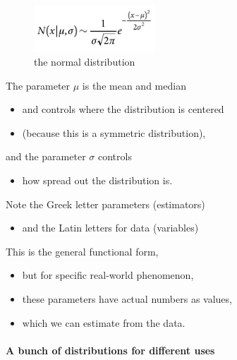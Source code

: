 \documentclass[]{article}
\providecommand{\tightlist}{%
  \setlength{\itemsep}{0pt}\setlength{\parskip}{0pt}}
\let\oldparagraph\paragraph
\renewcommand{\paragraph}[1]{\oldparagraph{#1}\mbox{}}
\begin{document}
\begin{figure}
\centering
\includegraphics[width=0.40000\textwidth]{figs/9a-1.png}
\caption{the normal distribution}
\end{figure}

The parameter \(\mu\) is the mean and median

\begin{itemize}
\tightlist
\item
  and controls where the distribution is centered
\item
  (because this is a symmetric distribution),
\end{itemize}

and the parameter \(\sigma\) controls

\begin{itemize}
\tightlist
\item
  how spread out the distribution is.
\end{itemize}

Note the Greek letter parameters (estimators)

\begin{itemize}
\tightlist
\item
  and the Latin letters for data (variables)
\end{itemize}

This is the general functional form,

\begin{itemize}
\tightlist
\item
  but for specific real-world phenomenon,
\item
  these parameters have actual numbers as values,
\item
  which we can estimate from the data.
\end{itemize}

\paragraph{A bunch of distributions for different
uses}\label{a-bunch-of-distributions-for-different-uses}
\end{document}
